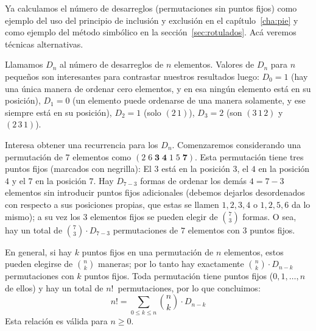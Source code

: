   Ya calculamos el número de desarreglos
  (permutaciones sin puntos fijos)
  como ejemplo del uso del principio de inclusión y exclusión
  en el capítulo~\ref{cha:pie}
  y como ejemplo del método simbólico
  en la sección~\ref{sec:rotulados}.
  Acá veremos técnicas alternativas.

  Llamamos \(D_n\) al número de desarreglos
  de \(n\) elementos.
  Valores de \(D_n\) para \(n\) pequeños son interesantes
  para contrastar nuestros resultados luego:
  \(D_0 = 1\)
  (hay una única manera de ordenar cero elementos,
   y en esa ningún elemento está en su posición),
  \(D_1 = 0\)
  (un elemento puede ordenarse de una manera solamente,
   y ese siempre está en su posición),
  \(D_2 = 1\)
  (solo \((2\,1)\)),
  \(D_3 = 2\)
  (son \((3\,1\,2)\) y \((2\,3\,1)\)).

  Interesa obtener una recurrencia para los \(D_n\).%
  Comenzaremos considerando una permutación de 7 elementos
  como \((2 \; 6 \; \mathbf{3} \; \mathbf{4} \; 1 \; 5 \; \mathbf{7})\).
  Esta permutación tiene tres puntos fijos
  (marcados con negrilla):
  El \(3\) está en la posición \(3\),
  el \(4\) en la posición \(4\)
  y el \(7\) en la posición \(7\).
  Hay \(D_{7 - 3}\) formas
  de ordenar los demás \(4 = 7 - 3\) elementos
  sin introducir puntos fijos adicionales
  (debemos dejarlos desordenados
   con respecto a sus posiciones propias,
   que estas se llamen \(1, 2, 3, 4\) o \(1, 2, 5, 6\) da lo mismo);
  a su vez los \(3\) elementos fijos
  se pueden elegir de \(\binom{7}{3}\) formas.
  O sea,
  hay un total de \(\binom{7}{3} \cdot D_{7 - 3}\) permutaciones
  de \(7\) elementos con \(3\) puntos fijos.

  En general,
  si hay \(k\) puntos fijos en una permutación de \(n\) elementos,
  estos pueden elegirse de \(\binom{n}{k}\) maneras;
  por lo tanto
  hay exactamente \(\binom{n}{k} \cdot D_{n - k}\) permutaciones
  con \(k\) puntos fijos.
  Toda permutación tiene puntos fijos (\(0, 1, \dotsc, n\) de ellos)
  y hay un total de \(n!\)~permutaciones,
  por lo que concluimos:
  \begin{equation}
    \label{eq:relacion-desarreglos}
    n! = \sum_{0 \le k \le n} \binom{n}{k} \cdot D_{n - k}
  \end{equation}
  Esta relación es válida para \(n \ge 0\).

